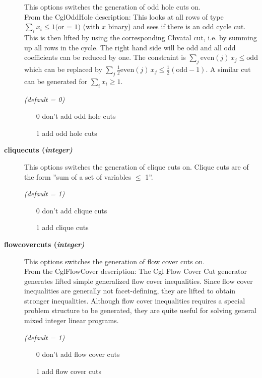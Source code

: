 \begin{description}
This options switches the generation of odd hole cuts on.\\
From the CglOddHole description:
This looks at all rows of type $\sum_i x_i \leq 1 \textrm{(or = 1)}$ (with $x$ binary) and sees if there is an odd cycle cut.
This is then lifted by using the corresponding Chvatal cut, i.e. by summing up all rows in the cycle.
The right hand side will be odd and all odd coefficients can be reduced by one.
The constraint is
$\sum_j \textrm{even}(j)\,x_j \leq \textrm{odd}$
which can be replaced by
$\sum_j \frac{1}{2}\textrm{even}(j)\,x_j \leq \frac{1}{2}(\textrm{odd}-1)$.
A similar cut can be generated for $\sum_i x_i \geq 1$.

\textsl{(default = 0)}
\begin{itemize}
\item[0] don't add odd hole cuts
\item[1] add odd hole cuts
\end{itemize}

\item[\label{cliquecuts}\hypertarget{cliquecuts}
{\textbf{cliquecuts (\slshape{integer})}}]\hspace{1.0in}

This options switches the generation of clique cuts on.
Clique cuts are of the form ''sum of a set of variables $\leq$ 1''.

\textsl{(default = 1)}
\begin{itemize}
\item[0] don't add clique cuts
\item[1] add clique cuts
\end{itemize}

\item[\label{flowcovercuts}\hypertarget{flowcovercuts}
{\textbf{flowcovercuts (\slshape{integer})}}]\hspace{1.0in}

This options switches the generation of flow cover cuts on.\\
From the CglFlowCover description:
The Cgl Flow Cover Cut generator generates lifted simple generalized flow cover inequalities.
Since flow cover inequalities are generally not facet-defining, they are lifted to obtain stronger inequalities.
Although flow cover inequalities requires a special problem structure to be generated, they are quite useful for solving general mixed integer linear programs.

\textsl{(default = 1)}
\begin{itemize}
\item[0] don't add flow cover cuts
\item[1] add flow cover cuts
\end{itemize}


\end{description}
